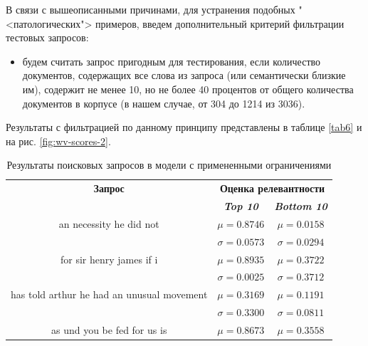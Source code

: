 В связи с вышеописанными причинами, для устранения подобных "<патологических"> примеров, введем дополнительный критерий фильтрации тестовых
запросов:
\begin{itemize}
    \item будем считать запрос пригодным для тестирования, если количество документов, содержащих все слова из запроса (или семантически
          близкие им), содержит не менее 10, но не более 40 процентов от общего количества документов в корпусе (в нашем случае, от 304 до 1214
          из 3036).
\end{itemize}

Результаты с фильтрацией по данному принципу представлены в таблице \ref{tab6} и на рис. \ref{fig:wv-scores-2}.
\begin{table}[tbp]
    \caption{Результаты поисковых запросов в модели с примененными ограничениями}
    \begin{center}
        \begin{tabular}{ccc}
            \toprule
            \textbf{Запрос} & \multicolumn{2}{c}{\textbf{Оценка релевантности}}                               \\
                            & \textbf{\textit{Top 10}}                          & \textbf{\textit{Bottom 10}} \\
            \midrule
            an necessity   he did not                 & \(\mu=0.8746\)                                    & \(\mu=0.0158\)              \\
                                                      & \(\sigma=0.0573\)                                 & \(\sigma=0.0294\)           \\
            \midrule
            for sir henry james  if i                 & \(\mu=0.8935\)                                    & \(\mu=0.3722\)              \\
                                                      & \(\sigma=0.0025\)                                 & \(\sigma=0.3712\)           \\
            \midrule
            has told arthur he had an unusual movement& \(\mu=0.3169\)                                    & \(\mu=0.1191\)              \\
                                                      & \(\sigma=0.3300\)                                 & \(\sigma=0.0811\)           \\
            \midrule
            as und you be fed for us is               & \(\mu=0.8673\)                                    & \(\mu=0.3558\)              \\

\end{tabular}
\end{center}
\end{table}

